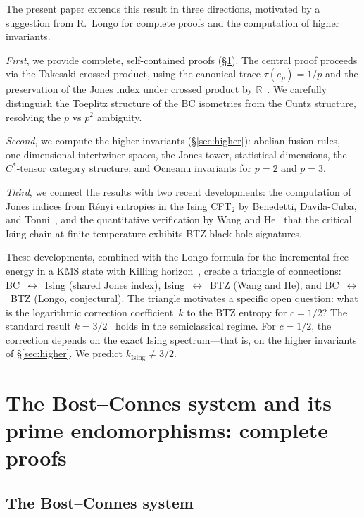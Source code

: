 \documentclass[aps,prl,twocolumn,superscriptaddress,showpacs]{revtex4-2}
\begin{document}
The present paper extends this result in three directions, motivated by a suggestion from R.~Longo for complete proofs and the computation of higher invariants.

\textit{First}, we provide complete, self-contained proofs (\S\ref{sec:proofs}). The central proof proceeds via the Takesaki crossed product, using the canonical trace $\tau(e_p) = 1/p$ and the preservation of the Jones index under crossed product by $\mathbb{R}$~\cite{Longo1989}. We carefully distinguish the Toeplitz structure of the BC isometries from the Cuntz structure, resolving the $p$ vs $p^2$ ambiguity.

\textit{Second}, we compute the higher invariants (\S\ref{sec:higher}): abelian fusion rules, one-dimensional intertwiner spaces, the Jones tower, statistical dimensions, the $C^*$-tensor category structure, and Ocneanu invariants for $p=2$ and $p=3$.

\textit{Third}, we connect the results with two recent developments: the computation of Jones indices from R\'enyi entropies in the Ising CFT$_2$ by Benedetti, Davila-Cuba, and Tonni~\cite{BenedettiDavilaTonni2026}, and the quantitative verification by Wang and He~\cite{WangHe2026} that the critical Ising chain at finite temperature exhibits BTZ black hole signatures.

These developments, combined with the Longo formula for the incremental free energy in a KMS state with Killing horizon~\cite{Longo2001}, create a triangle of connections: BC~$\leftrightarrow$~Ising (shared Jones index), Ising~$\leftrightarrow$~BTZ (Wang and He), and BC~$\leftrightarrow$~BTZ (Longo, conjectural). The triangle motivates a specific open question: what is the logarithmic correction coefficient~$k$ to the BTZ entropy for $c=1/2$? The standard result $k=3/2$~\cite{Carlip2000} holds in the semiclassical regime. For $c=1/2$, the correction depends on the exact Ising spectrum---that is, on the higher invariants of \S\ref{sec:higher}. We predict $k_{\mathrm{Ising}} \neq 3/2$.

\section{The Bost--Connes system and its prime endomorphisms: complete proofs}
\label{sec:proofs}

\subsection{The Bost--Connes system}
\end{document}
